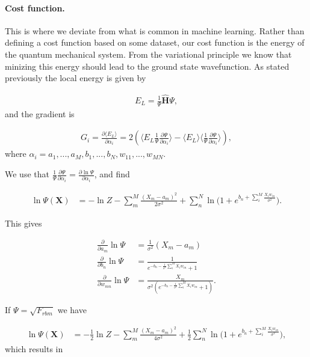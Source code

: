\documentclass[%
oneside,                 %
final,                   %
10pt]{article}
\begin{document}
\paragraph{Cost function.}
This is where we deviate from what is common in machine
learning. Rather than defining a cost function based on some dataset,
our cost function is the energy of the quantum mechanical system. From
the variational principle we know that minizing this energy should
lead to the ground state wavefunction. As stated previously the local
energy is given by

\begin{align}
	E_L = \frac{1}{\Psi} \hat{\mathbf{H}} \Psi,
\end{align}
and the gradient is

\begin{align}
	G_i = \frac{\partial \langle E_L \rangle}{\partial \alpha_i}
	= 2(\langle E_L \frac{1}{\Psi}\frac{\partial \Psi}{\partial \alpha_i} \rangle - \langle E_L \rangle \langle \frac{1}{\Psi}\frac{\partial \Psi}{\partial \alpha_i} \rangle ),
\end{align}
where $\alpha_i = a_1,...,a_M,b_1,...,b_N,w_{11},...,w_{MN}$.


We use that $\frac{1}{\Psi}\frac{\partial \Psi}{\partial \alpha_i} 
	= \frac{\partial \ln{\Psi}}{\partial \alpha_i}$,
and find

\begin{align}
	\ln{\Psi({\mathbf{X}})} &= -\ln{Z} - \sum_m^M \frac{(X_m - a_m)^2}{2\sigma^2}
	+ \sum_n^N \ln({1 + e^{b_n + \sum_i^M \frac{X_i w_{in}}{\sigma^2}})}.
\end{align}

This gives

\begin{align}
	\frac{\partial }{\partial a_m} \ln\Psi
	&= 	\frac{1}{\sigma^2} (X_m - a_m) \\
	\frac{\partial }{\partial b_n} \ln\Psi
	&=
	\frac{1}{e^{-b_n-\frac{1}{\sigma^2}\sum_i^M X_i w_{in}} + 1} \\
	\frac{\partial }{\partial w_{mn}} \ln\Psi
	&= \frac{X_m}{\sigma^2(e^{-b_n-\frac{1}{\sigma^2}\sum_i^M X_i w_{in}} + 1)}.
\end{align}

If $\Psi = \sqrt{F_{rbm}}$ we have

\begin{align}
	\ln{\Psi({\mathbf{X}})} &= -\frac{1}{2}\ln{Z} - \sum_m^M \frac{(X_m - a_m)^2}{4\sigma^2}
	+ \frac{1}{2}\sum_n^N \ln({1 + e^{b_n + \sum_i^M \frac{X_i w_{in}}{\sigma^2}})},
\end{align}
which results in
\end{document}
